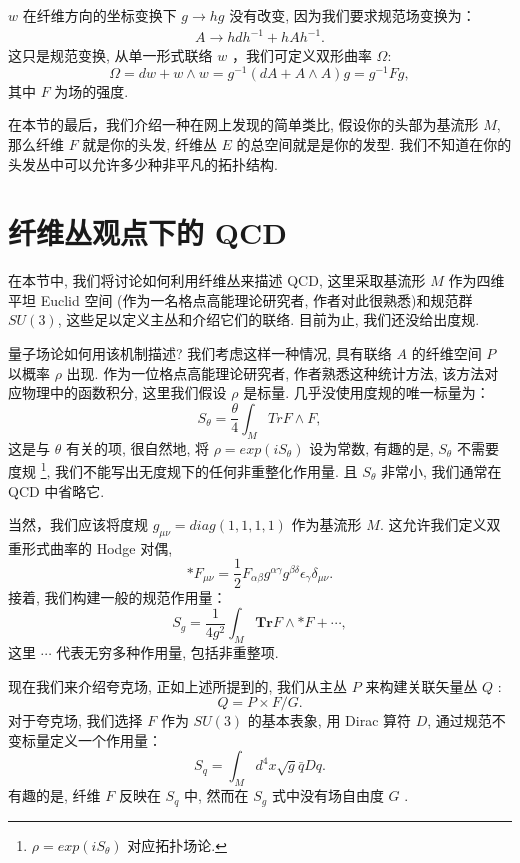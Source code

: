 \documentclass{article}
\begin{document}
\par $w$ 在纤维方向的坐标变换下 $g \rightarrow hg$ 没有改变, 因为我们要求规范场变换为：
\begin{align}
A \rightarrow hdh^{-1}+hAh^{-1}.
\end{align}
这只是规范变换, 从单一形式联络 $w$ ，我们可定义双形曲率 $\Omega$:
\begin{equation}
\Omega=dw+w\wedge w=g^{-1}(dA+A\wedge A)g=g^{-1}Fg,
\end{equation}
其中 $F$ 为场的强度.

\par 在本节的最后，我们介绍一种在网上发现的简单类比, 假设你的头部为基流形 $M$, 那么纤维 $F$ 就是你的头发, 纤维丛 $E$ 的总空间就是是你的发型. 我们不知道在你的头发丛中可以允许多少种非平凡的拓扑结构.
\section{纤维丛观点下的 QCD}
在本节中, 我们将讨论如何利用纤维丛来描述 QCD, 这里采取基流形 $M$ 作为四维平坦 Euclid 空间 (作为一名格点高能理论研究者, 作者对此很熟悉)和规范群 $SU(3)$, 这些足以定义主丛和介绍它们的联络. 目前为止, 我们还没给出度规.

\par 量子场论如何用该机制描述? 我们考虑这样一种情况, 具有联络 $A$ 的纤维空间 $P$ 以概率 $\rho$ 出现. 作为一位格点高能理论研究者, 作者熟悉这种统计方法, 该方法对应物理中的函数积分, 这里我们假设 $\rho$ 是标量. 几乎没使用度规的唯一标量为：
\begin{equation}
S_{\theta}=\frac{\theta}{4}\int_{M}Tr F\wedge F,
\end{equation}
这是与 $\theta$ 有关的项, 很自然地, 将 $\rho=exp(iS_{\theta})$ 设为常数, 有趣的是, $S_{\theta}$ 不需要度规 \footnote{$\rho=exp(iS_{\theta})$ 对应拓扑场论.}, 我们不能写出无度规下的任何非重整化作用量. 且 $S_{\theta}$ 非常小, 我们通常在 QCD 中省略它.
\par 当然，我们应该将度规 $g_{\mu\nu}= diag(1,1,1,1)$ 作为基流形 $M$. 这允许我们定义双重形式曲率的 Hodge 对偶,
\begin{equation}
*F_{\mu\nu}=\frac{1}{2}F_{\alpha\beta}g^{\alpha\gamma}g^{\beta\delta}\epsilon_{\gamma}\delta_{\mu\nu}.
\end{equation}
接着, 我们构建一般的规范作用量：
\begin{equation}
S_{g}=\frac{1}{4g^{2}}\int_{M}\textbf{Tr}F\wedge *F+ \cdots,
\end{equation}
这里 $\cdots$ 代表无穷多种作用量, 包括非重整项.
\par 现在我们来介绍夸克场, 正如上述所提到的, 我们从主丛 $P$ 来构建关联矢量丛 $Q$ :
\begin{equation}
Q=P\times F/G.
\end{equation}
对于夸克场, 我们选择 $F$ 作为 $SU(3)$ 的基本表象, 用 Dirac 算符 $D$, 通过规范不变标量定义一个作用量：
\begin{equation}
S_{q}=\int_{M}d^{4}x\sqrt{g}\bar{q}Dq.
\end{equation}
有趣的是, 纤维 $F$ 反映在 $S_{q}$ 中, 然而在 $S_{g}$ 式中没有场自由度 $G$ .
\end{document}
